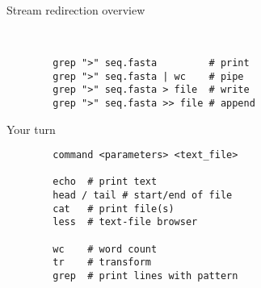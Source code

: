 \documentclass[xcolor=dvipsnames]{beamer}
\begin{document}
\begin{frame}[fragile]
	\huge
	Stream redirection overview
	\Large
	\begin{verbatim}
		
	
		grep ">" seq.fasta         # print
		grep ">" seq.fasta | wc    # pipe
		grep ">" seq.fasta > file  # write
		grep ">" seq.fasta >> file # append
	\end{verbatim}
\end{frame}

\begin{frame}[fragile]
	\huge
	Your turn
	\Large
	\begin{verbatim}
		command <parameters> <text_file>	
	
		echo  # print text
		head / tail # start/end of file
		cat   # print file(s)
		less  # text-file browser
		
		wc    # word count
		tr    # transform
		grep  # print lines with pattern
	\end{verbatim}
\end{frame}
\end{document}
